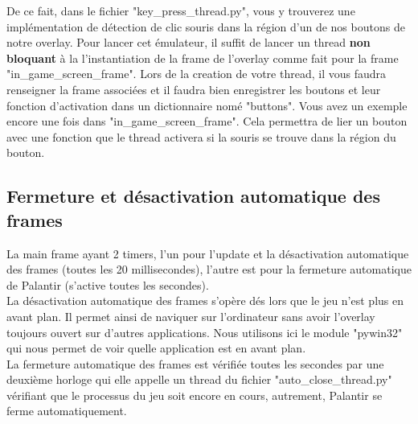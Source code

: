 \newpage

De ce fait, dans le fichier "key\_press\_thread.py", vous y trouverez une implémentation de détection de clic souris dans la région d'un de nos boutons de notre overlay. Pour lancer cet émulateur, il suffit de lancer un thread \textbf{non bloquant} à la l'instantiation de la frame de l'overlay comme fait pour la frame "in\_game\_screen\_frame". Lors de la creation de votre thread, il vous faudra renseigner la frame associées et il faudra bien enregistrer les boutons et leur fonction d'activation dans un dictionnaire nomé "buttons". Vous avez un exemple encore une fois dans "in\_game\_screen\_frame". Cela permettra de lier un bouton avec une fonction que le thread activera si la souris se trouve dans la région du bouton.

\subsection{Fermeture et désactivation automatique des frames}
La main frame ayant 2 timers, l'un pour l'update et la désactivation automatique des frames (toutes les 20 millisecondes), l'autre est pour la fermeture automatique de Palantir (s'active toutes les secondes).\\

La désactivation automatique des frames s'opère dés lors que le jeu n'est plus en avant plan. Il permet ainsi de naviquer sur l'ordinateur sans avoir l'overlay toujours ouvert sur d'autres applications. Nous utilisons ici le module "pywin32" qui nous permet de voir quelle application est en avant plan.\\

La fermeture automatique des frames est vérifiée toutes les secondes par une deuxième horloge qui elle appelle un thread du fichier "auto\_close\_thread.py" vérifiant que le processus du jeu soit encore en cours, autrement, Palantir se ferme automatiquement.